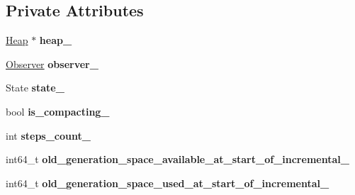 \subsection*{Private Attributes}
\begin{DoxyCompactItemize}
\item 
\hyperlink{classv8_1_1internal_1_1_heap}{Heap} $\ast$ {\bfseries heap\+\_\+}\hypertarget{classv8_1_1internal_1_1_incremental_marking_a9d4d60014ca0be58adc934b3605dad5d}{}\label{classv8_1_1internal_1_1_incremental_marking_a9d4d60014ca0be58adc934b3605dad5d}

\item 
\hyperlink{classv8_1_1internal_1_1_incremental_marking_1_1_observer}{Observer} {\bfseries observer\+\_\+}\hypertarget{classv8_1_1internal_1_1_incremental_marking_aff2d099c45b935fa16d1ccbdb4f3786a}{}\label{classv8_1_1internal_1_1_incremental_marking_aff2d099c45b935fa16d1ccbdb4f3786a}

\item 
State {\bfseries state\+\_\+}\hypertarget{classv8_1_1internal_1_1_incremental_marking_ad28527ada89f72a6a32cb90a9b5286d6}{}\label{classv8_1_1internal_1_1_incremental_marking_ad28527ada89f72a6a32cb90a9b5286d6}

\item 
bool {\bfseries is\+\_\+compacting\+\_\+}\hypertarget{classv8_1_1internal_1_1_incremental_marking_a3e7a8b28bcd1ce952f46132187093aa0}{}\label{classv8_1_1internal_1_1_incremental_marking_a3e7a8b28bcd1ce952f46132187093aa0}

\item 
int {\bfseries steps\+\_\+count\+\_\+}\hypertarget{classv8_1_1internal_1_1_incremental_marking_adbe36a396323cc6db46b2efa7e01cb2b}{}\label{classv8_1_1internal_1_1_incremental_marking_adbe36a396323cc6db46b2efa7e01cb2b}

\item 
int64\+\_\+t {\bfseries old\+\_\+generation\+\_\+space\+\_\+available\+\_\+at\+\_\+start\+\_\+of\+\_\+incremental\+\_\+}\hypertarget{classv8_1_1internal_1_1_incremental_marking_a3ee4c2952f81cf6099a5a2e28da6b641}{}\label{classv8_1_1internal_1_1_incremental_marking_a3ee4c2952f81cf6099a5a2e28da6b641}

\item 
int64\+\_\+t {\bfseries old\+\_\+generation\+\_\+space\+\_\+used\+\_\+at\+\_\+start\+\_\+of\+\_\+incremental\+\_\+}\hypertarget{classv8_1_1internal_1_1_incremental_marking_a499a9395741e22f1373ab2abba348d73}{}\label{classv8_1_1internal_1_1_incremental_marking_a499a9395741e22f1373ab2abba348d73}


\end{DoxyCompactItemize}
